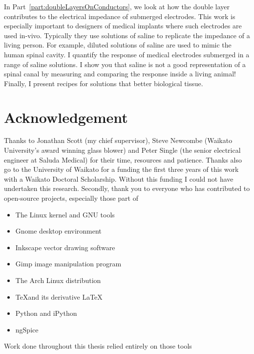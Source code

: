   In Part~\ref{part:doubleLayersOnConductors}, we look at how the double layer contributes to the electrical impedance of submerged electrodes.
  This work is especially important to designers of medical implants where such electrodes are used in-vivo.
  Typically they use solutions of saline to replicate the impedance of a living person.
  For example, diluted solutions of saline are used to mimic the human spinal cavity.
  I quantify the response of medical electrodes submerged in a range of saline solutions.
  I show you that saline is not a good representation of a spinal canal by measuring and comparing the response inside a living animal!
  Finally, I present recipes for solutions that better biological tissue.


\chapter*{Acknowledgement}
Thanks to Jonathan Scott (my chief supervisor), Steve Newcombe (Waikato University's award winning glass blower) and Peter Single (the senior electrical engineer at Saluda Medical) for their time, resources and patience. Thanks also go to the University of Waikato for a funding the first three years of this work with a Waikato Doctoral Scholarship. Without this funding I could not have undertaken this research.
Secondly, thank you to everyone who has contributed to open-source projects, especially those part of
\begin{itemize}
\item The Linux kernel and GNU tools
\item Gnome desktop environment
\item Inkscape vector drawing software
\item Gimp image manipulation program
\item The Arch Linux distribution
\item \TeX \space and its derivative \LaTeX
\item Python and iPython
\item ngSpice
\end{itemize}
Work done throughout this thesis relied entirely on those tools

\tableofcontents{}
\listoffigures
\listoftables
\doublespacing



